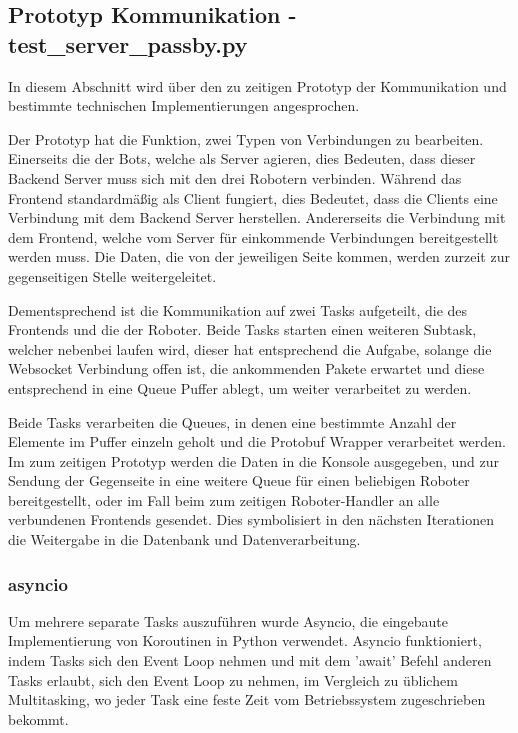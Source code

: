 \subsection{Prototyp Kommunikation - test\_server\_passby.py}
In diesem Abschnitt wird über den zu zeitigen Prototyp der Kommunikation 
und bestimmte technischen Implementierungen angesprochen.

Der Prototyp hat die Funktion, zwei Typen von Verbindungen zu bearbeiten.
% 
Einerseits die der Bots, welche als Server agieren, 
dies Bedeuten, dass dieser Backend Server muss sich mit den drei Robotern verbinden.
Während das Frontend standardmäßig als Client fungiert, 
dies Bedeutet, dass die Clients eine Verbindung mit dem Backend Server herstellen.
% 
Andererseits die Verbindung mit dem Frontend, 
welche vom Server für einkommende Verbindungen bereitgestellt werden muss.
% 
Die Daten, die von der jeweiligen Seite kommen, 
werden zurzeit zur gegenseitigen Stelle weitergeleitet.

Dementsprechend ist die Kommunikation auf zwei Tasks aufgeteilt,
die des Frontends und die der Roboter.
Beide Tasks starten einen weiteren Subtask, welcher nebenbei laufen wird, 
dieser hat entsprechend die Aufgabe, solange die Websocket Verbindung offen ist,
die ankommenden Pakete erwartet und diese entsprechend in eine Queue Puffer ablegt, 
um weiter verarbeitet zu werden. 

Beide Tasks verarbeiten die Queues, 
in denen eine bestimmte Anzahl der Elemente im Puffer 
einzeln geholt und die Protobuf Wrapper verarbeitet werden.
% 
Im zum zeitigen Prototyp werden die Daten in die Konsole ausgegeben,
und zur Sendung der Gegenseite in eine weitere Queue 
für einen beliebigen Roboter bereitgestellt, 
oder im Fall beim zum zeitigen Roboter-Handler an alle verbundenen Frontends gesendet.
% 
Dies symbolisiert in den nächsten Iterationen die Weitergabe 
in die Datenbank und Datenverarbeitung.


\subsubsection{asyncio}
Um mehrere separate Tasks auszuführen wurde Asyncio,
die eingebaute Implementierung von Koroutinen in Python verwendet.
% 
Asyncio funktioniert, indem Tasks sich den Event Loop nehmen und mit dem 'await' 
Befehl anderen Tasks erlaubt, sich den Event Loop zu nehmen, 
im Vergleich zu üblichem Multitasking,
wo jeder Task eine feste Zeit vom Betriebssystem zugeschrieben bekommt.

